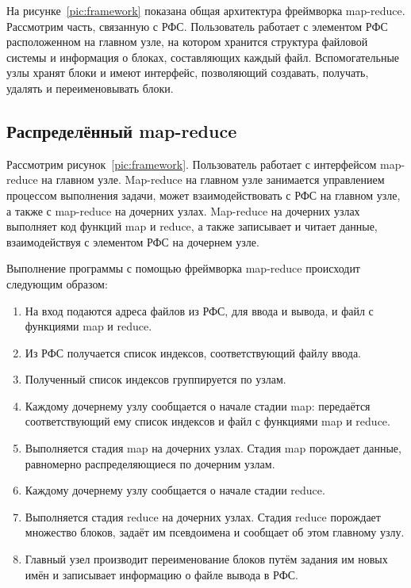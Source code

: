\documentclass[12pt,a4paper,oneside]{extarticle}
\begin{document}
        На рисунке~\ref{pic:framework} показана общая архитектура фреймворка map-reduce. Рассмотрим часть, связанную с РФС.
        Пользователь работает с элементом РФС расположенном на главном узле, на котором хранится структура файловой системы и информация о блоках, составляющих каждый файл.
        Вспомогательные узлы хранят блоки и имеют интерфейс, позволяющий создавать, получать, удалять и переименовывать блоки.
    \subsection{Распределённый map-reduce}
        Рассмотрим рисунок~\ref{pic:framework}. Пользователь работает с интерфейсом map-reduce на главном узле. Map-reduce на главном узле занимается управлением процессом выполнения задачи, может взаимодействовать с РФС на главном узле, а также с map-reduce на дочерних узлах. Map-reduce на дочерних узлах выполняет код функций map и reduce, а также записывает и читает данные, взаимодействуя с элементом РФС на дочернем узле.

        Выполнение программы с помощью фреймворка map-reduce происходит следующим образом:
        \begin{enumerate}
            \item На вход подаются адреса файлов из РФС, для ввода и вывода, и файл с функциями map и reduce.
            \item Из РФС получается список индексов, соответствующий файлу ввода.
            \item Полученный список индексов группируется по узлам.
            \item Каждому дочернему узлу сообщается о начале стадии map: передаётся соответствующий ему список индексов и файл с функциями map и reduce.
            \item Выполняется стадия map на дочерних узлах. Стадия map порождает данные, равномерно распределяющиеся по дочерним узлам.
            \item Каждому дочернему узлу сообщается о начале стадии reduce.
            \item Выполняется стадия reduce на дочерних узлах. Стадия reduce порождает множество блоков, задаёт им псевдоимена и сообщает об этом главному узлу.
            \item Главный узел производит переименование блоков путём задания им новых имён и записывает информацию о файле вывода в РФС.
        \end{enumerate}
        
\end{document}
